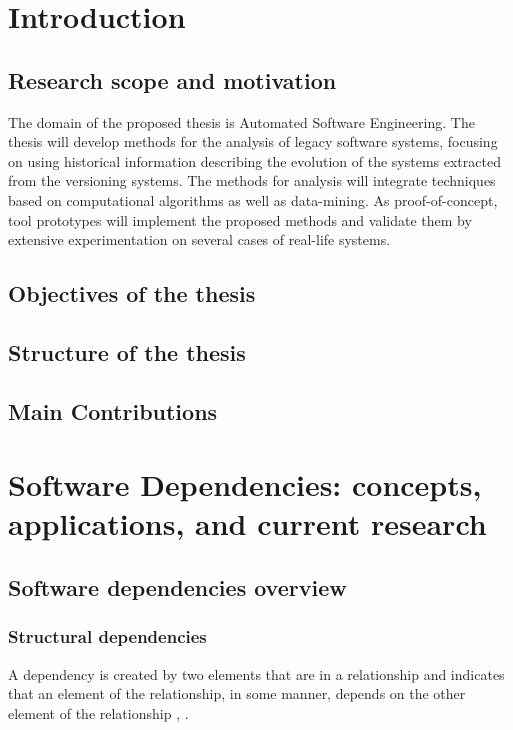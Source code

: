 \chapter{Introduction}
\section{Research scope and motivation}


The domain of the proposed thesis is Automated Software Engineering. The thesis will develop methods for the analysis of legacy software systems, focusing on using historical information describing the evolution of the systems extracted from the versioning systems. 
The methods for analysis will integrate techniques based on computational algorithms as well as data-mining. As proof-of-concept, tool prototypes will implement the proposed methods and validate them by extensive experimentation on several cases of real-life systems.\\

\section{Objectives of the thesis}

\section{Structure of the thesis}

\section{Main Contributions}




\chapter{Software Dependencies: concepts, applications, and current research}
\label{dep}

\section{Software dependencies overview}

\subsection{Structural dependencies}
\hspace{4em} A dependency is created by two elements that are in a relationship and indicates that an element of the relationship, in some manner, depends on the other element of the relationship \cite{Booch:2004:OAD:975416}, \cite{Cataldo2009SoftwareDW}.

